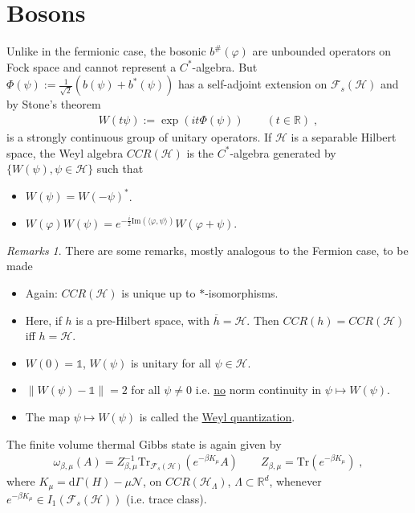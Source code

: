 \documentclass[
a4paper, %
11pt, %
onecolumn, %
openany, %
]{memoir}
\theoremstyle{definition}
\theoremstyle{remark}
\newtheorem{remarks}[definition]{Remarks}
\theoremstyle{plain}
\begin{document}
\section{Bosons}
Unlike in the fermionic case, the bosonic $b^{\#}(\varphi)$ are unbounded operators on Fock space and cannot represent a $C^*$-algebra. But $\Phi(\psi):=\frac{1}{\sqrt{2}}(b(\psi)+b^*(\psi))$ has a self-adjoint extension on $\mathcal{F}_s(\mathcal{H})$ and by Stone's theorem \begin{align}
W(t\psi):=\exp(it\Phi(\psi))\qquad (t\in\mathbb{R})\; ,
\end{align}
is a strongly continuous group of unitary operators. If $\mathcal{H}$ is a separable Hilbert space, the Weyl algebra $CCR(\mathcal{H})$ is the $C^*$-algebra generated by $\{W(\psi),\psi\in\mathcal{H}\}$ such that \begin{itemize}
	\item $W(\psi)=W(-\psi)^*$.
	\item $W(\varphi)W(\psi)=e^{-\frac{i}{2}\mathrm{Im}(\langle\varphi,\psi\rangle)}W(\varphi+\psi)$.
\end{itemize}
\begin{remarks}
	There are some remarks, mostly analogous to the Fermion case, to be made \begin{itemize}
		\item Again: $CCR(\mathcal{H})$ is unique up to $*$-isomorphisms.
		\item Here, if $h$ is a pre-Hilbert space, with $\overline{h}=\mathcal{H}$. Then $CCR(h)=CCR(\mathcal{H})$ iff $h=\mathcal{H}$.
		\item $W(0)=\mathds{1}$, $W(\psi)$ is unitary for all $\psi\in\mathcal{H}$.
		\item $\|W(\psi)-\mathds{1}\|=2$ for all $\psi\neq 0$ i.e. \underline{no} norm continuity in $\psi\mapsto W(\psi)$.
		\item The map $\psi\mapsto W(\psi)$ is called the \underline{Weyl quantization}.
	\end{itemize}
\end{remarks}
The finite volume thermal Gibbs state is again given by \begin{align}
\omega_{\beta,\mu}(A)=Z^{-1}_{\beta,\mu}\mathrm{Tr}_{\mathcal{F}_s(\mathcal{H})}(e^{-\beta K_{\mu}}A)\qquad Z_{\beta,\mu}=\mathrm{Tr}(e^{-\beta K_{\mu}}) \label{eqn::symm_gibbs}\; ,
\end{align}
where $K_{\mu}=\mathrm{d}\Gamma(H)-\mu\mathcal{N}$, on $CCR(\mathcal{H}_{\Lambda})$, $\Lambda\subset\mathbb{R}^d$, whenever $e^{-\beta K_{\mu}}\in I_1(\mathcal{F}_s(\mathcal{H}))$ (i.e. trace class).
\end{document}
